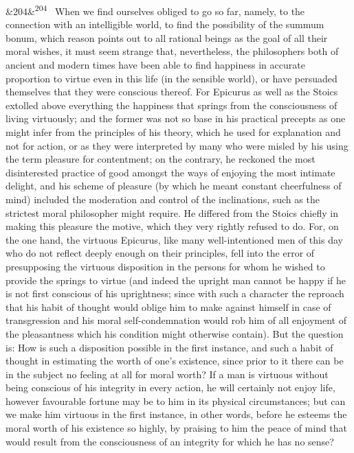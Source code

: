 \documentclass[12pt]{article}
\newcommand{\para}[1][]{\par\noindent\ifx&#1&\else\textsuperscript{\footnotesize #1}~\fi}
\begin{document}
\para[204] When we find ourselves obliged to go so far, namely, to the connection with an intelligible world, to find the possibility of the summum bonum, which reason points out to all rational beings as the goal of all their moral wishes, it must seem strange that, nevertheless, the philosophers both of ancient and modern times have been able to find happiness in accurate proportion to virtue even in this life (in the sensible world), or have persuaded themselves that they were conscious thereof. For Epicurus as well as the Stoics extolled above everything the happiness that springs from the consciousness of living virtuously; and the former was not so base in his practical precepts as one might infer from the principles of his theory, which he used for explanation and not for action, or as they were interpreted by many who were misled by his using the term pleasure for contentment; on the contrary, he reckoned the most disinterested practice of good amongst the ways of enjoying the most intimate delight, and his scheme of pleasure (by which he meant constant cheerfulness of mind) included the moderation and control of the inclinations, such as the strictest moral philosopher might require. He differed from the Stoics chiefly in making this pleasure the motive, which they very rightly refused to do. For, on the one hand, the virtuous Epicurus, like many well-intentioned men of this day who do not reflect deeply enough on their principles, fell into the error of presupposing the virtuous disposition in the persons for whom he wished to provide the springs to virtue (and indeed the upright man cannot be happy if he is not first conscious of his uprightness; since with such a character the reproach that his habit of thought would oblige him to make against himself in case of transgression and his moral self-condemnation would rob him of all enjoyment of the pleasantness which his condition might otherwise contain). But the question is: How is such a disposition possible in the first instance, and such a habit of thought in estimating the worth of one's existence, since prior to it there can be in the subject no feeling at all for moral worth? If a man is virtuous without being conscious of his integrity in every action, he will certainly not enjoy life, however favourable fortune may be to him in its physical circumstances; but can we make him virtuous in the first instance, in other words, before he esteems the moral worth of his existence so highly, by praising to him the peace of mind that would result from the consciousness of an integrity for which he has no sense?
\end{document}
